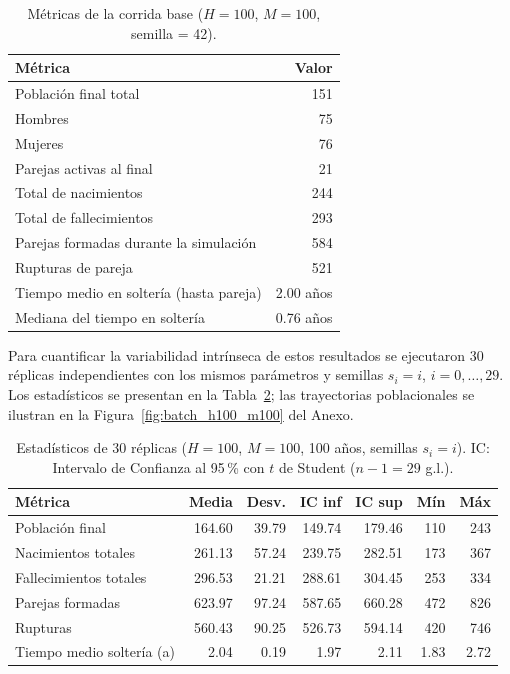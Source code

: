 \documentclass[12pt, a4paper]{article}
\begin{document}
\begin{table}[H]
  \centering
  \caption{Métricas de la corrida base ($H=100$, $M=100$, semilla = 42).}
  \label{tab:base}
  \begin{tabular}{@{}lr@{}}
    \toprule
    \textbf{Métrica}                         & \textbf{Valor} \\
    \midrule
    Población final total                    & 151 \\
    \quad Hombres                            & 75 \\
    \quad Mujeres                            & 76 \\
    \quad Parejas activas al final           & 21 \\
    Total de nacimientos                     & 244 \\
    Total de fallecimientos                  & 293 \\
    Parejas formadas durante la simulación   & 584 \\
    Rupturas de pareja                       & 521 \\
    Tiempo medio en soltería (hasta pareja)  & 2.00 años \\
    Mediana del tiempo en soltería           & 0.76 años \\
    \bottomrule
  \end{tabular}
\end{table}

\noindent
Para cuantificar la variabilidad intrínseca de estos resultados se ejecutaron
30 réplicas independientes con los mismos parámetros y semillas
$s_i = i$, $i = 0, \ldots, 29$. Los estadísticos se presentan en la
Tabla~\ref{tab:batch_base}; las trayectorias poblacionales se ilustran en
la Figura~\ref{fig:batch_h100_m100} del Anexo.

\begin{table}[H]
  \centering
  \caption{Estadísticos de 30 réplicas ($H=100$, $M=100$, 100 años,
           semillas $s_i=i$). IC: Intervalo de Confianza al 95\,\% con $t$ de Student ($n-1=29$ g.l.).}
  \label{tab:batch_base}
  \small
  \begin{tabular}{@{}lrrrrrr@{}}
    \toprule
    \textbf{Métrica} & \textbf{Media} & \textbf{Desv.} & \textbf{IC inf} & \textbf{IC sup} & \textbf{Mín} & \textbf{Máx} \\
    \midrule
    Población final           & 164.60 & 39.79 & 149.74 & 179.46 & 110 & 243 \\
    Nacimientos totales       & 261.13 & 57.24 & 239.75 & 282.51 & 173 & 367 \\
    Fallecimientos totales    & 296.53 & 21.21 & 288.61 & 304.45 & 253 & 334 \\
    Parejas formadas          & 623.97 & 97.24 & 587.65 & 660.28 & 472 & 826 \\
    Rupturas                  & 560.43 & 90.25 & 526.73 & 594.14 & 420 & 746 \\
    Tiempo medio soltería (a) &   2.04 &  0.19 &   1.97 &   2.11 & 1.83 & 2.72 \\
    \bottomrule
  \end{tabular}
\end{table}
\end{document}

